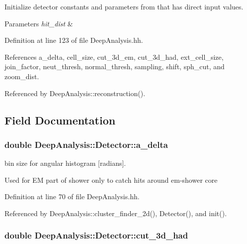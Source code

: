 Initialize detector constants and parameters from that has direct input values. 


\begin{DoxyParams}{Parameters}
{\em hit\-\_\-dist} & \\
\hline
\end{DoxyParams}


Definition at line 123 of file Deep\-Analysis.\-hh.



References a\-\_\-delta, cell\-\_\-size, cut\-\_\-3d\-\_\-em, cut\-\_\-3d\-\_\-had, ext\-\_\-cell\-\_\-size, join\-\_\-factor, neut\-\_\-thresh, normal\-\_\-thresh, sampling, shift, sph\-\_\-cut, and zoom\-\_\-dist.



Referenced by Deep\-Analysis\-::reconstruction().



\subsection{Field Documentation}
\subsubsection[{a\-\_\-delta}]{\setlength{\rightskip}{0pt plus 5cm}double Deep\-Analysis\-::\-Detector\-::a\-\_\-delta}\label{classDeepAnalysis_1_1Detector_a73833e2ee36a7ade0f7960a9344692be}


bin size for angular histogram [radians]. 

Used for E\-M part of shower only to catch hits around em-\/shower core 

Definition at line 70 of file Deep\-Analysis.\-hh.



Referenced by Deep\-Analysis\-::cluster\-\_\-finder\-\_\-2d(), Detector(), and init().

\subsubsection[{cut\-\_\-3d\-\_\-had}]{\setlength{\rightskip}{0pt plus 5cm}double Deep\-Analysis\-::\-Detector\-::cut\-\_\-3d\-\_\-had}\label{classDeepAnalysis_1_1Detector_a5cbc531fe713289bc6682f4086129b5c}


